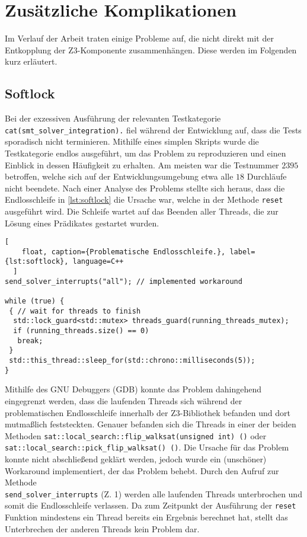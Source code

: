
\section{Zusätzliche Komplikationen}

Im Verlauf der Arbeit traten einige Probleme auf, die nicht direkt mit der Entkopplung der Z3-Komponente zusammenhängen. Diese werden im Folgenden kurz erläutert.

\subsection{Softlock}
\label{subsec:softlock}

Bei der exzessiven Ausführung der relevanten Testkategorie \texttt{cat(smt\_solver\_integration).} fiel während der Entwicklung auf,
dass die Tests sporadisch nicht terminieren.
Mithilfe eines simplen Skripts wurde die Testkategorie endlos ausgeführt, um das Problem zu reproduzieren und einen Einblick in dessen Häufigkeit zu erhalten.
Am meisten war die Testnummer $2395$ betroffen, welche sich auf der Entwicklungsumgebung etwa alle $18$ Durchläufe nicht beendete.
Nach einer Analyse des Problems stellte sich heraus, dass die Endlosschleife in \cref{lst:softlock} die Ursache war, welche in der Methode \texttt{reset} ausgeführt wird.
Die Schleife wartet auf das Beenden aller Threads, die zur Lösung eines Prädikates gestartet wurden.

\begin{lstlisting}[
    float, caption={Problematische Endlosschleife.}, label={lst:softlock}, language=C++
  ]
send_solver_interrupts("all"); // implemented workaround

while (true) {
 { // wait for threads to finish
  std::lock_guard<std::mutex> threads_guard(running_threads_mutex);
  if (running_threads.size() == 0)
   break;
 }
 std::this_thread::sleep_for(std::chrono::milliseconds(5));
}
\end{lstlisting}
Mithilfe des GNU Debuggers (GDB) \cite{stallman1988debugging} konnte das Problem dahingehend eingegrenzt werden,
dass die laufenden Threads sich während der problematischen Endlosschleife innerhalb der Z3-Bibliothek befanden
und dort mutmaßlich feststeckten.
Genauer befanden sich die Threads in einer der beiden Methoden \texttt{sat::local\_search::flip\_walksat(unsigned int) ()} oder \texttt{sat::local\_search::pick\_flip\_walksat() ()}.
Die Ursache für das Problem konnte nicht abschließend geklärt werden, jedoch wurde ein (unschöner) Workaround implementiert, der das Problem behebt.
Durch den Aufruf zur Methode \\
\texttt{send\_solver\_interrupts} (Z. 1) werden alle laufenden Threads unterbrochen und somit die Endlosschleife verlassen.
Da zum Zeitpunkt der Ausführung der \texttt{reset} Funktion mindestens ein Thread bereits ein Ergebnis berechnet hat, stellt das Unterbrechen der anderen Threads kein Problem dar.

